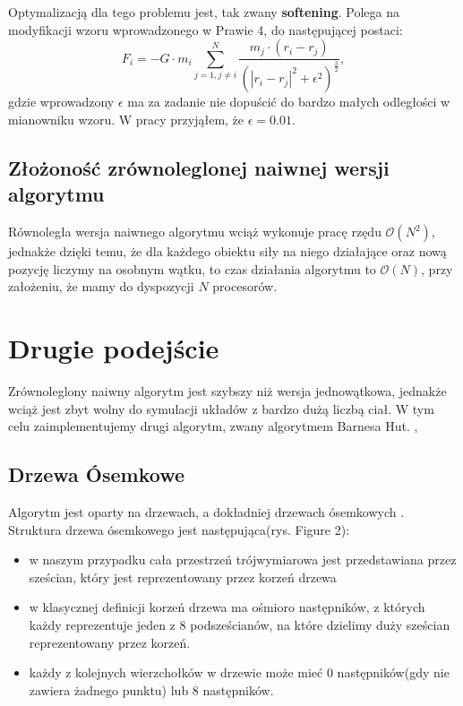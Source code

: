 \documentclass[14pt,twoside,a4paper]{article}
\theoremstyle{definition}
\begin{document}
Optymalizacją dla tego problemu jest, tak zwany \textbf{softening}\cite[str.~21]{Aarseth}. Polega na modyfikacji wzoru wprowadzonego w Prawie 4, do następującej postaci:
$$F_i = -G\cdot m_i \sum_{j=1, j\neq i}^N \frac{m_j\cdot (r_i - r_j)}{(|r_i - r_j|^2 + \epsilon^{2})^{\frac{3}{2}}},$$ 
gdzie wprowadzony $\epsilon$ ma za zadanie nie dopuścić do bardzo małych odległości w mianowniku wzoru. W pracy przyjąłem, że $\epsilon = 0.01$.

\subsection{\Large Złożoność zrównoleglonej naiwnej wersji algorytmu}
Równoległa wersja naiwnego algorytmu wciąż wykonuje pracę rzędu $\mathcal{O}(N^{2})$, jednakże dzięki temu, że dla każdego obiektu siły na niego działające oraz nową pozycję liczymy na osobnym wątku, to czas działania algorytmu to $\mathcal{O}(N)$, przy założeniu, że mamy do dyspozycji $N$ procesorów.

\section{\LARGE Drugie podejście}
Zrównoleglony naiwny algorytm jest szybszy niż wersja jednowątkowa, jednakże wciąż jest zbyt wolny do symulacji układów z bardzo dużą liczbą ciał. W tym celu zaimplementujemy drugi algorytm, zwany algorytmem Barnesa Hut. \cite[str.~446-449]{barnhut}, \cite{barneshut} \bigskip

\bigskip

\subsection{\Large Drzewa Ósemkowe}

Algorytm jest oparty na drzewach, a dokładniej drzewach ósemkowych \cite{octree}.
Struktura drzewa ósemkowego jest następująca(rys. Figure 2):
\begin{itemize}
  \item w naszym przypadku cała przestrzeń trójwymiarowa jest przedstawiana przez sześcian, który jest reprezentowany przez korzeń drzewa
  \item w klasycznej definicji korzeń drzewa ma ośmioro następników, z których każdy reprezentuje jeden z 8 podsześcianów, na które dzielimy duży sześcian reprezentowany przez korzeń.
  \item każdy z kolejnych wierzchołków w drzewie może mieć 0 następników(gdy nie zawiera żadnego punktu) lub 8 następników.
\end{itemize}
\end{document}
